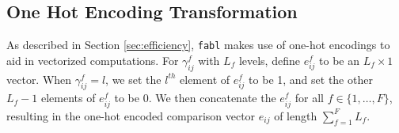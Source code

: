 \documentclass[ba]{imsart}
\begin{document}
%	
%			
%			
%			
%			
%			
	
	\hypertarget{app:ohe}{%
		\subsection{One Hot Encoding Transformation}\label{app:ohe}}
	
	As described in Section \ref{sec:efficiency}, \texttt{fabl} makes use of one-hot encodings to aid in vectorized computations. For $\gamma_{ij}^f$ with $L_f$ levels, define $e_{ij}^f$ to be an $L_f \times 1$ vector.  When $\gamma_{ij}^f = l$, we set the $l^{th}$ element of $e_{ij}^f$ to be 1, and set the other $L_f - 1$ elements of $e_{ij}^f$ to be 0. We then concatenate the $e_{ij}^f$ for all $f \in \{1, \ldots, F\}$, resulting in the one-hot encoded comparison vector $e_{ij}$ of length $\sum_{f=1}^F L_f$.
	
\end{document}
